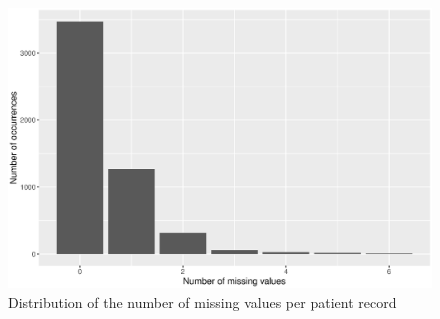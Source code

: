 \begin{figure}[h]
	\centering
   \includegraphics[scale=0.6]{Resources/n_miss}
   \caption{Distribution of the number of missing values per patient record}
   \label{fig.n_miss}
\end{figure}